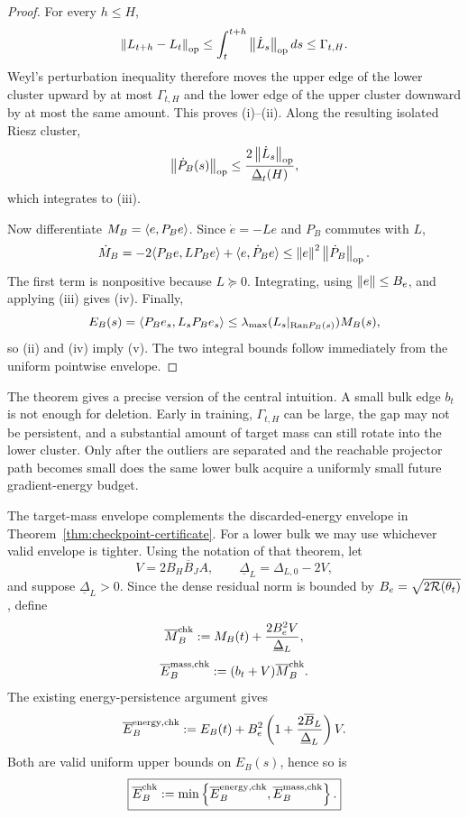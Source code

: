 \begin{proof}
For every $h\le H$,
\[
\left\lVert L_{t+h}-L_t\right\rVert_{\mathrm{op}}
\le
\int_t^{t+h}\left\lVert \dot L_s\right\rVert_{\mathrm{op}}ds
\le\Gamma_{t,H}.
\]
Weyl's perturbation inequality therefore moves the upper edge of the lower cluster upward by at most $\Gamma_{t,H}$ and the lower edge of the upper cluster downward by at most the same amount.  This proves (i)--(ii).  Along the resulting isolated Riesz cluster,
\[
\left\lVert \dot P_B(s)\right\rVert_{\mathrm{op}}
\le
\frac{2\left\lVert \dot L_s\right\rVert_{\mathrm{op}}}{\underline\Delta_t(H)},
\]
which integrates to (iii).

Now differentiate $M_B=\langle e,P_Be\rangle$.  Since $\dot e=-Le$ and $P_B$ commutes with $L$,
\[
\dot M_B
=-2\langle P_Be,LP_Be\rangle+\langle e,\dot P_Be\rangle
\le
\left\lVert e\right\rVert^2\left\lVert \dot P_B\right\rVert_{\mathrm{op}}.
\]
The first term is nonpositive because $L\succeq0$.  Integrating, using $\left\lVert e\right\rVert\le B_e$, and applying (iii) gives (iv).  Finally,
\[
E_B(s)=\langle P_Be_s,L_sP_Be_s\rangle
\le
\lambda_{\max}(L_s|_{\mathrm{Ran} P_B(s)})M_B(s),
\]
so (ii) and (iv) imply (v).  The two integral bounds follow immediately from the uniform pointwise envelope.
\end{proof}

\begin{remark}
The theorem gives a precise version of the central intuition.  A small bulk edge $b_t$ is not enough for deletion.  Early in training, $\Gamma_{t,H}$ can be large, the gap may not be persistent, and a substantial amount of target mass can still rotate into the lower cluster.  Only after the outliers are separated and the reachable projector path becomes small does the same lower bulk acquire a uniformly small future gradient-energy budget.
\end{remark}

The target-mass envelope complements the discarded-energy envelope in Theorem~\ref{thm:checkpoint-certificate}.  For a lower bulk we may use whichever valid envelope is tighter.  Using the notation of that theorem, let
\[
V=2B_H\overline B_JA,
\qquad
\underline\Delta_L=\Delta_{L,0}-2V,
\]
and suppose $\underline\Delta_L>0$.  Since the dense residual norm is bounded by $B_e=\sqrt{2\mathcal R(\theta_t)}$, define
\[
\overline M_B^{\rm chk}
:=M_B(t)+\frac{2B_e^2V}{\underline\Delta_L},
\]
\[
\overline E_B^{\rm mass,chk}
:=(b_t+V)\overline M_B^{\rm chk}.
\]
The existing energy-persistence argument gives
\[
\overline E_B^{\rm energy,chk}
:=E_B(t)+B_e^2
\left(1+\frac{2\overline B_L}{\underline\Delta_L}\right)V.
\]
Both are valid uniform upper bounds on $E_B(s)$, hence so is
\[
\boxed{
\overline E_B^{\rm chk}
:=\min\left\{
\overline E_B^{\rm energy,chk},
\overline E_B^{\rm mass,chk}
\right\}.}
\]

